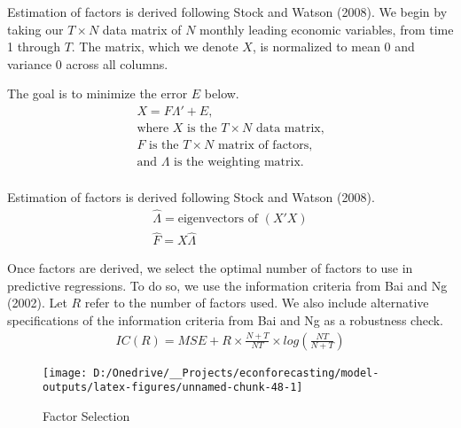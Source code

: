 \documentclass[11pt, letterpaper]{article}\usepackage[]{graphicx}\usepackage[]{color}
\begin{document}
Estimation of factors is derived following Stock and Watson (2008). We begin by taking our $T \times N$ data matrix of $N$ monthly leading economic variables, from time 1 through $T$. The matrix, which we denote $X$, is normalized to mean 0 and variance 0 across all columns.

The goal is to minimize the error $E$ below.
\begin{align*}
	X = F  \Lambda ' + E,\\
	\text{where $X$ is the $T \times N$ data matrix,}\\
	\text{$F$ is the $T \times N$ matrix of factors,}\\
	\text{and $\Lambda$ is the weighting matrix.}\\
\end{align*}

Estimation of factors is derived following Stock and Watson (2008).
\begin{align*}
	\widehat{\Lambda} = \text{eigenvectors of } (X'X)\\
	\widehat{F} = X \widehat{\Lambda}
\end{align*}



Once factors are derived, we select the optimal number of factors to use in predictive regressions. To do so, we use the information criteria from Bai and Ng (2002). Let $R$ refer to the number of factors used. We also include alternative specifications of the information criteria from Bai and Ng as a robustness check.
\begin{align*}
	IC(R) = MSE + R \times \frac{N+T}{NT} \times log\left(\frac{NT}{N+T}\right)
\end{align*}

\begin{figure}[H]

{\centering \texttt{[image: D:/Onedrive/\_\_Projects/econforecasting/model-outputs/latex-figures/unnamed-chunk-48-1]} 

}

\caption[Factor Selection]{Factor Selection}\label{fig:unnamed-chunk-48}
\end{figure}
\end{document}
